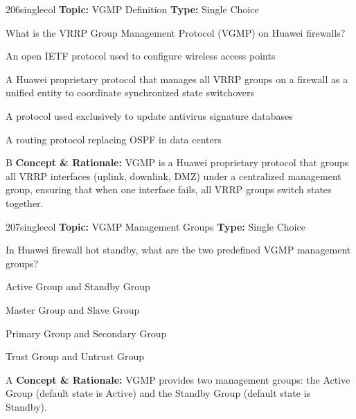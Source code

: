 \begin{qcard}{206}{singlecol}
\textcolor{darkslate!75}{\small\textbf{Topic:} VGMP Definition \hfill \textbf{Type:} Single Choice}\vspace{0.4em}\par
What is the VRRP Group Management Protocol (VGMP) on Huawei firewalls?
\begin{qoptions}
\item An open IETF protocol used to configure wireless access points
\item A Huawei proprietary protocol that manages all VRRP groups on a firewall as a unified entity to coordinate synchronized state switchovers
\item A protocol used exclusively to update antivirus signature databases
\item A routing protocol replacing OSPF in data centers
\end{qoptions}
\end{qcard}
\nopagebreak
\begin{explainbox}{B}
\textbf{Concept \& Rationale:} VGMP is a Huawei proprietary protocol that groups all VRRP interfaces (uplink, downlink, DMZ) under a centralized management group, ensuring that when one interface fails, all VRRP groups switch states together.
\end{explainbox}

\begin{qcard}{207}{singlecol}
\textcolor{darkslate!75}{\small\textbf{Topic:} VGMP Management Groups \hfill \textbf{Type:} Single Choice}\vspace{0.4em}\par
In Huawei firewall hot standby, what are the two predefined VGMP management groups?
\begin{qoptions}
\item Active Group and Standby Group
\item Master Group and Slave Group
\item Primary Group and Secondary Group
\item Trust Group and Untrust Group
\end{qoptions}
\end{qcard}
\nopagebreak
\begin{explainbox}{A}
\textbf{Concept \& Rationale:} VGMP provides two management groups: the Active Group (default state is Active) and the Standby Group (default state is Standby).
\end{explainbox}

